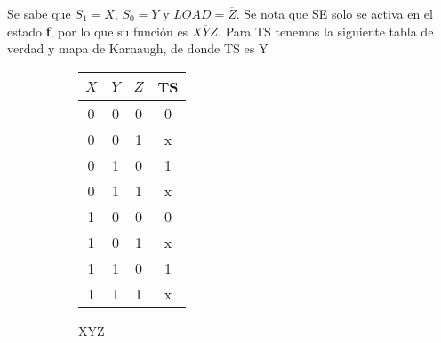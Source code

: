 %
%
%

  Se sabe que $S_1 = X$, $S_0 = Y$ y $LOAD = \overline{Z}$. Se nota que SE solo se activa en el estado \textbf{f}, por lo que su función
  es $X \overline{Y} Z$. Para TS tenemos la siguiente tabla de verdad y mapa de Karnaugh, de donde
  TS es $\text{Y}$
  \begin{figure}[H]
    \begin{subfigure}{0.49\textwidth}
      \centering
      \begin{tabular}{c c c c}
        \toprule
        $X$ & $Y$ & $Z$ & TS \\ \midrule
        0     & 0     & 0   & 0 \\
        0     & 0     & 1   & x \\
        0     & 1     & 0   & 1 \\
        0     & 1     & 1   & x \\
        1     & 0     & 0   & 0 \\
        1     & 0     & 1   & x \\
        1     & 1     & 0   & 1 \\
        1     & 1     & 1   & x \\
        \bottomrule
      \end{tabular}
    \end{subfigure}
    \begin{subfigure}{0.49\textwidth}
      \centering
      \begin{Karnaughvuit}{X}{Y}{Z}
      \end{Karnaughvuit}
    \end{subfigure}
  \end{figure}
